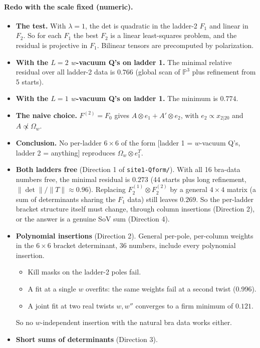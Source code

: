 \documentclass[11pt]{article}
\newcommand{\Om}{\Omega}
\begin{document}
\paragraph{Redo with the scale fixed (numeric).}\label{sec:redo}
\begin{itemize}
\item \textbf{The test.} With $\lambda=1$, the det is quadratic in the ladder-2 $F_1$ and linear in $F_2$. So for each $F_1$ the best $F_2$ is a linear least-squares problem, and the residual is projective in $F_1$. Bilinear tensors are precomputed by polarization.
\item \textbf{With the $L=2$ $w$-vacuum Q's on ladder 1.} The minimal relative residual over all ladder-2 data is $0.766$ (global scan of $\mathbb P^3$ plus refinement from 5 starts).
\item \textbf{With the $L=1$ $w$-vacuum Q's on ladder 1.} The minimum is $0.774$.
\item \textbf{The naive choice.} $F^{(2)}=F_0$ gives $A\otimes e_1+A'\otimes e_2$, with $e_2\propto x_{2|20}$ and $A\not\propto\Om_w$.
\item \textbf{Conclusion.} No per-ladder $6\times6$ of the form [ladder 1 = $w$-vacuum Q's, ladder 2 = anything] reproduces $\Om_w\otimes e_1^T$.
\item \textbf{Both ladders free} (Direction 1 of \texttt{site1-Qform/}). With all 16 bra-data numbers free, the minimal residual is $0.273$ (44 starts plus long refinement, $\|\det\|/\|T\|\approx0.96$). Replacing $F_2^{(1)}\otimes F_2^{(2)}$ by a general $4\times4$ matrix (a sum of determinants sharing the $F_1$ data) still leaves $0.269$. So the per-ladder bracket structure itself must change, through column insertions (Direction 2), or the answer is a genuine SoV sum (Direction 4).
\item \textbf{Polynomial insertions} (Direction 2). General per-pole, per-column weights in the $6\times6$ bracket determinant, 36 numbers, include every polynomial insertion.
\begin{itemize}
\item Kill masks on the ladder-2 poles fail.
\item A fit at a single $w$ overfits: the same weights fail at a second twist (0.996).
\item A joint fit at two real twists $w,w''$ converges to a firm minimum of $0.121$.
\end{itemize}
So no $w$-independent insertion with the natural bra data works either.
\item \textbf{Short sums of determinants} (Direction 3).

\end{itemize}
\end{document}
